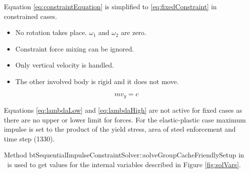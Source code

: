 Equation \ref{eq:constraintEquation} is simplified
to \ref{eq:fixedConstraint} in constrained cases.
\begin{itemize}
\item No rotation takes place. $\omega_1$ and $\omega_2$ are zero.
\item Constraint force mixing can be ignored.
\item Only vertical velocity is handled.
\item The other involved body is rigid and it does not move.
\end{itemize} 

\begin{equation} \label{eq:fixedConstraint}
m v_y = c 
\end{equation}

Equations \ref{eq:lambdaLow} and \ref{eq:lambdaHigh} are not active for fixed cases as
there are no upper or lower limit for forces.
For the elastic-plastic case maximum impulse is set to the product of the yield stress, 
area of steel enforcement and time step (1330).

Method btSequentialImpulseConstraintSolver::solveGroupCacheFriendlySetup
in \cbullet\ is used to get values for the internal variables described in Figure \ref{fig:solVars}. 

